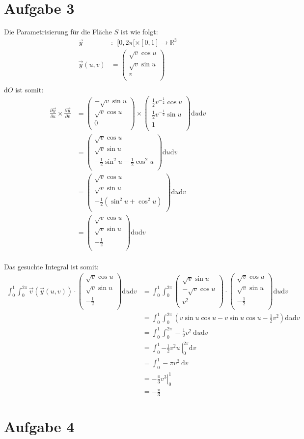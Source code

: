 \documentclass[10pt,a4paper,parskip=half]{scrartcl}
\newcommand{\vecthree}[3]{\begin{pmatrix}#1\\#2\\#3\\\end {pmatrix}}
\begin{document}
\section*{Aufgabe 3}
Die Parametrisierung für die Fläche $S$ ist wie folgt:
\begin{align*}
\vec y&:~~ [0,2\pi[ \times [0,1] \to \mathbb{R}^3\\
\vec y(u,v) &= \vecthree{\sqrt v\cos u}{\sqrt v\sin u}{v} \\
\end{align*}
$\mathrm d O$ ist somit:
\begin{align*}
\frac{\partial \vec y}{\partial u} \times \frac{\partial \vec y}{\partial v} &= \vecthree{-\sqrt{v}\sin u}{\sqrt{v}\cos u}{0} \times \vecthree{\frac 1 2 v^{-\frac 1 2}\cos u}{\frac 1 2 v^{-\frac 1 2} \sin u}{1} \mathrm d u \mathrm d v\\
&= \vecthree{\sqrt{v}\cos u}{\sqrt{v}\sin u}{-\frac 1 2 \sin^2 u - \frac 1 2 \cos^2 u} \mathrm d u \mathrm d v\\
&= \vecthree{\sqrt{v}\cos u}{\sqrt{v}\sin u}{-\frac 1 2 (\sin^2 u + \cos^2 u)} \mathrm d u \mathrm d v\\
&= \vecthree{\sqrt{v}\cos u}{\sqrt{v}\sin u}{-\frac 1 2} \mathrm d u \mathrm d v\\
\end{align*}

Das gesuchte Integral ist somit:
\begin{align*}
\int_0^1 \int_0^{2\pi} \vec v(\vec y(u,v)) \cdot \vecthree{\sqrt{v}\cos u}{\sqrt{v}\sin u}{-\frac 1 2} \mathrm d u \mathrm d v &= \int_0^1 \int_0^{2\pi} \vecthree{\sqrt v\sin u}{-\sqrt v\cos u}{v^2} \cdot \vecthree{\sqrt{v}\cos u}{\sqrt{v}\sin u}{-\frac 1 2} \mathrm d u \mathrm d v \\
&= \int_0^1 \int_0^{2\pi} \left(v \sin u \cos u - v \sin u \cos u - \frac 1 2 v^2\right) \mathrm d u \mathrm d v \\
&= \int_0^1 \int_0^{2\pi} - \frac 1 2 v^2~ \mathrm d u \mathrm d v \\
&= \int_0^1 \left. - \frac 1 2 v^2 u~ \right|_0^{2\pi} \mathrm d v \\
&= \int_0^1 - \pi v^2 ~ \mathrm d v \\
&= \left. - \frac \pi 3 v^3 \right|_0^1 \\
&= -\frac \pi 3
\end{align*}
\section*{Aufgabe 4}
\end{document}
